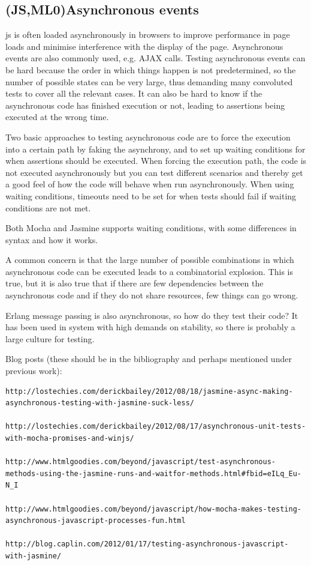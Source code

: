 \documentclass[11pt]{article}
\begin{document}
\subsection{(JS,ML0)Asynchronous events}

\gls{js} is often loaded asynchronously in browsers to improve performance in page loads and minimise interference with the display of the page. Asynchronous events are also commonly used, e.g. AJAX calls. Testing asynchronous events can be hard because the order in which things happen is not predetermined, so the number of possible states can be very large, thus demanding many convoluted tests to cover all the relevant cases. It can also be hard to know if the asynchronous code has finished execution or not, leading to assertions being executed at the wrong time.

Two basic approaches to testing asynchronous code are to force the execution into a certain path by faking the asynchrony, and to set up waiting conditions for when assertions should be executed. When forcing the execution path, the code is not executed asynchronously but you can test different scenarios and thereby get a good feel of how the code will behave when run asynchronously. When using waiting conditions, timeouts need to be set for when tests should fail if waiting conditions are not met.

Both Mocha and Jasmine supports waiting conditions, with some differences in syntax and how it works.

A common concern is that the large number of possible combinations in which asynchronous code can be executed leads to a combinatorial explosion. This is true, but it is also true that if there are few dependencies between the asynchronous code and if they do not share resources, few things can go wrong.

Erlang message passing is also asynchronous, so how do they test their code? It has been used in system with high demands on stability, so there is probably a large culture for testing.

Blog posts (these should be in the bibliography and perhaps mentioned under previous work):
\begin{verbatim}
http://lostechies.com/derickbailey/2012/08/18/jasmine-async-making-asynchronous-testing-with-jasmine-suck-less/

http://lostechies.com/derickbailey/2012/08/17/asynchronous-unit-tests-with-mocha-promises-and-winjs/

http://www.htmlgoodies.com/beyond/javascript/test-asynchronous-methods-using-the-jasmine-runs-and-waitfor-methods.html#fbid=eILq_Eu-N_I

http://www.htmlgoodies.com/beyond/javascript/how-mocha-makes-testing-asynchronous-javascript-processes-fun.html

http://blog.caplin.com/2012/01/17/testing-asynchronous-javascript-with-jasmine/
\end{verbatim}
\end{document}
